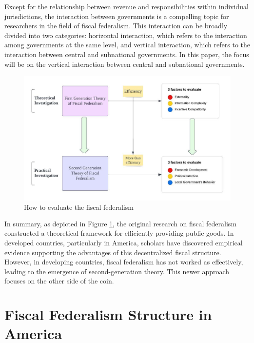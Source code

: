 Except for the relationship between revenue and responsibilities within individual jurisdictions, the interaction between governments is a compelling topic for researchers in the field of fiscal federalism. This interaction can be broadly divided into two categories: horizontal interaction, which refers to the interaction among governments at the same level, and vertical interaction, which refers to the interaction between central and subnational governments. In this paper, the focus will be on the vertical interaction between central and subnational governments.


\begin{figure}[H]
    \centering
    \includegraphics[scale=1]{Chapter-2/Figures/how to evaluate the fiscal federalism.jpeg}
    \caption[How to evaluate the fiscal federalism]{How to evaluate the fiscal federalism
        \texttt{} }
    \label{Figure 1.2}
\end{figure}

In summary, as depicted in Figure \ref*{Figure 1.2}, the original research on fiscal federalism constructed a theoretical framework for efficiently providing public goods. In developed countries, particularly in America, scholars have discovered empirical evidence supporting the advantages of this decentralized fiscal structure. However, in developing countries, fiscal federalism has not worked as effectively, leading to the emergence of second-generation theory. This newer approach focuses on the other side of the coin.


\section{Fiscal Federalism Structure in America}
